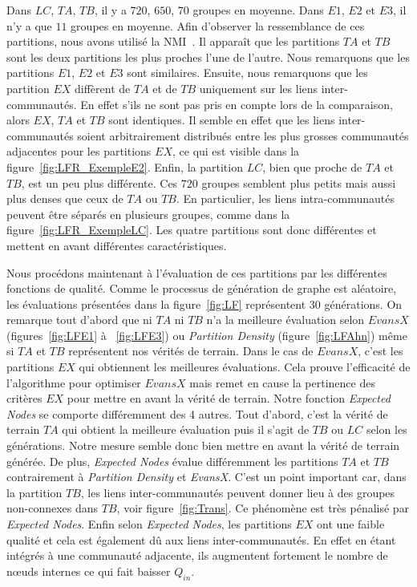 Dans $LC$, $TA$, $TB$, il y a $720$, $650$, $70$ groupes en moyenne.
Dans $E1$, $E2$ et $E3$, il n'y a que $11$ groupes en moyenne.
Afin d'observer la ressemblance de ces partitions, nous avons utilisé la NMI~\cite{Danon2005}.
Il apparaît que les partitions $TA$ et $TB$ sont les deux partitions les plus proches l'une de l'autre.
Nous remarquons que les partitions $E1$, $E2$ et $E3$ sont similaires.
Ensuite, nous remarquons que les partition $EX$ diffèrent de $TA$ et de $TB$ uniquement sur les liens inter-communautés.
En effet s'ils ne sont pas pris en compte lors de la comparaison, alors $EX$, $TA$ et $TB$ sont identiques.
Il semble en effet que les liens inter-communautés soient arbitrairement distribués entre les plus grosses communautés adjacentes pour les partitions $EX$, ce qui est visible dans la figure~\ref{fig:LFR_ExempleE2}.
Enfin, la partition $LC$, bien que proche de $TA$ et $TB$, est un peu plus différente.
Ces $720$ groupes semblent plus petits mais aussi plus denses que ceux de $TA$ ou $TB$.
En particulier, les liens intra-communautés peuvent être séparés en plusieurs groupes, comme dans la figure~\ref{fig:LFR_ExempleLC}.
Les quatre partitions sont donc différentes et mettent en avant différentes caractéristiques.

Nous procédons maintenant à l'évaluation de ces partitions par les différentes fonctions de qualité.
Comme le processus de génération de graphe est aléatoire, les évaluations présentées dans la figure~\ref{fig:LF} représentent $30$ générations.
On remarque tout d'abord que ni $TA$ ni $TB$ n'a la meilleure évaluation selon $EvansX$ (figures~\ref{fig:LFE1} à ~\ref{fig:LFE3}) ou \emph{Partition Density} (figure~\ref{fig:LFAhn}) même si $TA$ et $TB$ représentent nos vérités de terrain.
Dans le cas de $EvansX$, c'est les partitions $EX$ qui obtiennent les meilleures évaluations.
Cela prouve l'efficacité de l'algorithme pour optimiser $EvansX$ mais remet en cause la pertinence des critères $EX$ pour mettre en avant la vérité de terrain.
Notre fonction \emph{Expected Nodes} se comporte différemment des 4 autres.
Tout d'abord, c'est la vérité de terrain $TA$ qui obtient la meilleure évaluation puis il s'agit de $TB$ ou $LC$ selon les générations.
Notre mesure semble donc bien mettre en avant la vérité de terrain générée.
De plus, \emph{Expected Nodes} évalue différemment les partitions $TA$ et $TB$ contrairement à \emph{Partition Density} et \emph{EvansX}.
C'est un point important car, dans la partition $TB$, les liens inter-communautés peuvent donner lieu à des groupes non-connexes dans $TB$, voir figure~\ref{fig:Trans}.
Ce phénomène est très pénalisé par \emph{Expected Nodes}.
Enfin selon \emph{Expected Nodes}, les partitions $EX$ ont une faible qualité et cela est également dû aux liens inter-communautés.
En effet en étant intégrés à une communauté adjacente, ils augmentent fortement le nombre de n\oe uds internes ce qui fait baisser $Q_{in}$.

